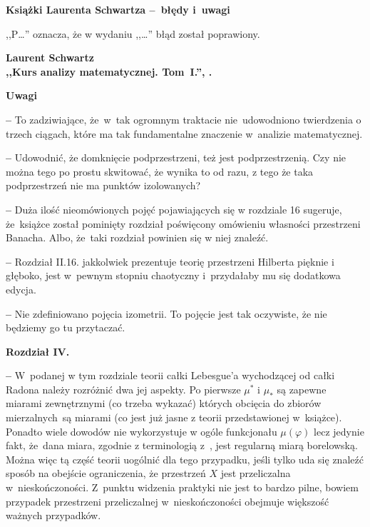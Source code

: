 \documentclass[a4paper]{article}
\newcommand{\spaceTwo}{1em}
\newcommand{\spaceThree}{0.5em}
\newcommand{\vp}{\varphi}
\newcommand{\tb}{\textbf}
\newcommand{\noi}{\noindent}
\newcommand{\start}{\noi \tb{--} {}}
\newcommand{\Center}[1]{\begin{center} #1 \end{center}}
\newcommand{\CenterTB}[1]{\Center{\tb{#1}}}
\newcommand{\Field}[1]{ \begin{center} {\Large \tb{#1} } \end{center} }
\newcommand{\Work}[1]{ \begin{center} {\large \tb{#1}} \end{center} }
\begin{document}
\Field{Książki Laurenta Schwartza --~błędy i~uwagi}

,,P\ldots'' oznacza, że w wydaniu ,,\ldots'' błąd został poprawiony. \\



\Work{
  Laurent Schwartz \\
  ,,Kurs analizy matematycznej. Tom~I.'', \cite{Sch79}.}


\CenterTB{Uwagi}

\start To zadziwiające, że~w~tak ogromnym traktacie nie~udowodniono
twierdzenia o trzech ciągach, które ma tak fundamentalne znaczenie
w~analizie matematycznej.
  
\start Udowodnić, że domknięcie podprzestrzeni, też jest
podprzestrzenią. Czy nie można tego po prostu skwitować, że wynika to
od razu, z tego że taka podprzestrzeń nie ma punktów izolowanych?
  
\start Duża ilość nieomówionych pojęć pojawiających się w rozdziale 16
sugeruje, że~książce został pominięty rozdział poświęcony omówieniu
własności przestrzeni Banacha. Albo, że~taki rozdział powinien się w
niej znaleźć.
  
\start Rozdział II.16. jakkolwiek prezentuje teorię przestrzeni
Hilberta pięknie i głęboko, jest w~pewnym stopniu chaotyczny
i~przydałaby mu się dodatkowa edycja.
  
\start Nie zdefiniowano pojęcia izometrii. To pojęcie jest tak
oczywiste, że nie będziemy go tu przytaczać.

\vspace{\spaceTwo}

\noi \tb{Rozdział IV.}

\vspace{\spaceThree}

\start W~podanej w tym rozdziale teorii całki Lebesgue'a wychodzącej
od całki Radona należy rozróżnić dwa jej aspekty. Po pierwsze
$\mu^{ * }$ i $\mu_{ * }$ są zapewne miarami zewnętrznymi (co trzeba
wykazać) których obcięcia do zbiorów mierzalnych~są miarami (co jest
już jasne z teorii przedstawionej w~książce). Ponadto wiele dowodów
nie wykorzystuje w ogóle funkcjonału $\mu( \vp )$ lecz jedynie fakt,
że~dana miara, zgodnie z terminologią z~\cite{Rud86}, jest regularną
miarą borelowską. Można więc tą część teorii uogólnić dla tego
przypadku, jeśli tylko uda się znaleźć sposób na obejście
ograniczenia, że przestrzeń $X$ jest przeliczalna w~nieskończoności.
Z~punktu widzenia praktyki nie jest to bardzo pilne, bowiem przypadek
przestrzeni przeliczalnej w~nieskończoności obejmuje większość ważnych
przypadków.
\end{document}
